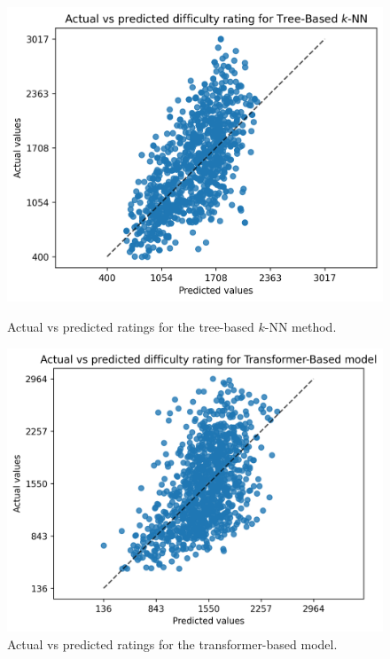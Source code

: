 \begin{figure}[H]
  \begin{minipage}{0.475\textwidth}
    \centering
    \includegraphics[width=\textwidth]{evaluation/img/tree.png}
    \caption{Actual vs predicted ratings for the tree-based $k$-NN method.}
    \label{predTree}
  \end{minipage}
  \hspace{0.05\textwidth}
  \begin{minipage}{0.475\textwidth}
    \centering
    \includegraphics[width=\textwidth]{evaluation/img/transformer.png}
    \caption{Actual vs predicted ratings for the transformer-based model.}
    \label{predTransformer}
  \end{minipage}
\end{figure}

